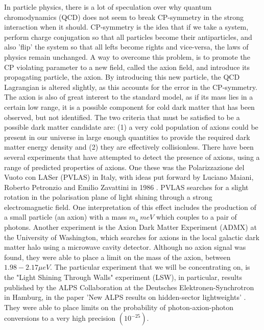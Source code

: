 \documentclass[12pt]{article}
\begin{document}
In particle physics, there is a lot of speculation over why quantum chromodynamics (QCD) does not seem to break CP-symmetry in the strong interaction \autocite{Peccei, R.D. (2006). The Strong CP Problem and Axions} when it should. CP-symmetry is the idea that if we take a system, perform charge conjugation so that all particles become their antiparticles, and also 'flip' the system so that all lefts become rights and vice-versa, the laws of physics remain unchanged. A way to overcome this problem, is to promote the CP violating parameter to a new field, called the axion field, and introduce its propagating particle, the axion. By introducing this new particle, the QCD Lagrangian is altered slightly, as this accounts for the error in the CP-symmetry. 
The axion is also of great interest to the standard model, as if its mass lies in a certain low range, it is a possible component for cold dark matter \autocite{Duffy, L.D., Bibber, K. (2009). Axions as Dark Matter Particles}  that has been observed, but not identified. The two criteria that must be satisfied to be a possible dark matter candidate are: (1) a very cold population of axions could be present in our universe in large enough quantities to provide the required dark matter energy density and (2) they are effectively collisionless. There have been several experiments that have attempted to detect the presence of axions, using a range of predicted properties of axions. 
One these was the Polarizzazione del Vuoto con LASer (PVLAS) in Italy, with ideas put forward by Luciano Maiani, Roberto Petronzio and Emilio Zavattini in 1986 \autocite{Maiani, L., Petronzio, R., Zavattini, E.(1986). Effects of nearly massless, spin-zero particles on light propagation in a magnetic field}. PVLAS searches for a slight rotation in the polarisation plane of light shining through a strong electromagnetic field. One interpretation \autocite{Ringwald, D. (2006). Axion interpretation of the PVLAS data?} of this effect includes the production of a small particle (an axion) with a mass $m_a~meV$ which couples to a pair of photons.
Another experiment is the Axion Dark Matter Experiment\autocite{Duffy, L.D. et al. (2006). A High Resolution Search for Dark-Matter Axions} (ADMX) at the University of Washington, which searches for axions in the local galactic dark matter halo using a microwave cavity detector. Although no axion signal was found, they were able to place a limit on the mass of the axion, between $1.98-2.17 \mu eV$. 
The particular experiment that we will be concentrating on, is the "Light Shining Through Walls" experiment (LSW), in particular, results published by the ALPS Collaboration at the Deutsches Elektronen-Synchrotron in Hamburg, in the paper 'New ALPS results on hidden-sector lightweights' \autocite{Ehret, K. et al (2010). New ALPS results on hidden-sector lightweights}. They were able to place limits on the probability of photon-axion-photon conversions to a very high precision $(10^{-25})$. 
\end{document}
